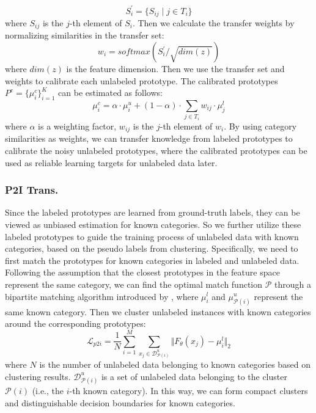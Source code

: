 \documentclass[letterpaper]{article} %
\begin{document}
\begin{equation}
    S_{i}^{\prime} = \{ S_{ij} \mid j \in T_{i}  \}
\end{equation}
where $S_{ij}$ is the $j$-th element of $S_{i}$. Then we calculate the transfer weights by normalizing similarities in the transfer set:
\begin{equation}
    w_{i} = softmax(S_{i}^{\prime}/\sqrt{dim(z)})
\end{equation}
where $dim(z)$ is the feature dimension. Then we use the transfer set and weights to calibrate each unlabeled prototype. The calibrated prototypes $P^{c} = \{\mu_{i}^{c}\}_{i=1}^{K}$ can be estimated as follows:
\begin{equation}
    \mu_{i}^{c} = \alpha \cdot \mu_{i}^{u} + (1-\alpha) \cdot \sum_{j \in T_{i}} w_{ij} \cdot \mu_{j}^{l}
\end{equation}
where $\alpha$ is a weighting factor, $w_{ij}$ is the $j$-th element of $w_{i}$. By using category similarities as weights, we can transfer knowledge from labeled prototypes to calibrate the noisy unlabeled prototypes, where the calibrated prototypes can be used as reliable learning targets for unlabeled data later.


\subsubsection{P2I Trans.} Since the labeled prototypes are learned from ground-truth labels, they can be viewed as unbiased estimation for known categories. So we further utilize these labeled prototypes to guide the training process of unlabeled data with known categories, based on the pseudo labels from clustering. Specifically, we need to first match the prototypes for known categories in labeled and unlabeled data. Following the assumption that the closest prototypes in the feature space represent the same category, we can find the optimal match function $\mathcal{P}$ through a bipartite matching algorithm introduced by \citet{dpn}, where $\mu_{i}^{l}$ and $\mu_{\mathcal{P}(i)}^{u}$ represent the same known category. Then we cluster unlabeled instances with known categories around the corresponding prototypes:
\begin{equation}
    \mathcal{L}_{p2i} = \frac{1}{N}\sum_{i=1}^{M}\sum_{x_{j} \in \mathcal{D}^{u}_{\mathcal{P}(i)}} \Vert{F_{\theta}(x_{j}) - \mu_{i}^{l}}\Vert_{2}
\end{equation}
where $N$ is the number of unlabeled data belonging to known categories based on clustering results. $\mathcal{D}^{u}_{\mathcal{P}(i)}$ is a set of unlabeled data belonging to the cluster $\mathcal{P}(i)$ (i.e., the $i$-th known category). In this way, we can form compact clusters and distinguishable decision boundaries for known categories.
\end{document}
